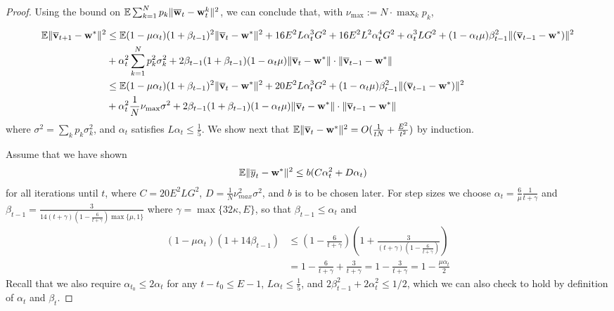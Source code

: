 \begin{proof}
Using the bound on $\mathbb{E}\sum_{k=1}^{N}p_{k}\|{\overline{\mathbf{w}}}_{t}-{\mathbf{w}}_{t}^{k}\|^{2}$,
we can conclude that, with $\nu_{\max}:=N\cdot\max_{k}p_{k}$,

\begin{align*}
\mathbb{E}\|{\overline{\mathbf{v}}}_{t+1}-{\mathbf{w}}^{\ast}\|^{2} & \leq\mathbb{E}(1-\mu\alpha_{t})(1+\beta_{t-1})^{2}\|{\overline{\mathbf{v}}}_{t}-{\mathbf{w}}^{\ast}\|^{2}+16E^{2}L\alpha_{t}^{3}G^{2}+16E^{2}L^{2}\alpha_{t}^{4}G^{2}+\alpha_{t}^{3}LG^{2}+(1-\alpha_{t}\mu)\beta_{t-1}^{2}\|({\overline{\mathbf{v}}}_{t-1}-{\mathbf{w}}^{\ast})\|^{2}\\
& +\alpha_{t}^{2}\sum_{k=1}^{N}p_{k}^{2}\sigma_{k}^{2}+2\beta_{t-1}(1+\beta_{t-1})(1-\alpha_{t}\mu)\|{\overline{\mathbf{v}}}_{t}-{\mathbf{w}}^{\ast}\|\cdot\|{\overline{\mathbf{v}}}_{t-1}-{\mathbf{w}}^{\ast}\|\\
& \leq\mathbb{E}(1-\mu\alpha_{t})(1+\beta_{t-1})^{2}\|{\overline{\mathbf{v}}}_{t}-{\mathbf{w}}^{\ast}\|^{2}+20E^{2}L\alpha_{t}^{3}G^{2}+(1-\alpha_{t}\mu)\beta_{t-1}^{2}\|({\overline{\mathbf{v}}}_{t-1}-{\mathbf{w}}^{\ast})\|^{2}\\
& +\alpha_{t}^{2}\frac{1}{N}\nu_{\max}\sigma^{2}+2\beta_{t-1}(1+\beta_{t-1})(1-\alpha_{t}\mu)\|{\overline{\mathbf{v}}}_{t}-{\mathbf{w}}^{\ast}\|\cdot\|{\overline{\mathbf{v}}}_{t-1}-{\mathbf{w}}^{\ast}\|
\end{align*}
where $\sigma^{2}=\sum_{k}p_{k}\sigma_{k}^{2}$, and $\alpha_{t}$
satisfies $L\alpha_{t}\leq\frac{1}{5}$. We show next that $\mathbb{E}\|{\overline{\mathbf{v}}}_{t}-{\mathbf{w}}^{\ast}\|^{2}=O(\frac{1}{tN}+\frac{E^{2}}{t^{2}})$
by induction.

Assume that we have shown 
\begin{align*}
\mathbb{E}\|\overline{y}_{t}-{\mathbf{w}}^{\ast}\|^{2} & \leq b(C\alpha_{t}^{2}+D\alpha_{t})
\end{align*}
for all iterations until $t$, where $C=20E^{2}LG^{2}$, $D=\frac{1}{N}\nu_{max}^{2}\sigma^{2}$,
and $b$ is to be chosen later. For step sizes we choose $\alpha_{t}=\frac{6}{\mu}\frac{1}{t+\gamma}$
and $\beta_{t-1}=\frac{3}{14(t+\gamma)(1-\frac{6}{t+\gamma})\max\{\mu,1\}}$
where $\gamma=\max\{32\kappa,E\}$, so that $\beta_{t-1}\leq\alpha_{t}$
and 
\begin{align*}
(1-\mu\alpha_{t})(1+14\beta_{t-1}) & \leq(1-\frac{6}{t+\gamma})(1+\frac{3}{(t+\gamma)(1-\frac{6}{t+\gamma})})\\
& =1-\frac{6}{t+\gamma}+\frac{3}{t+\gamma}=1-\frac{3}{t+\gamma}=1-\frac{\mu\alpha_{t}}{2}
\end{align*}
Recall that we also require $\alpha_{t_{0}}\leq2\alpha_{t}$ for any
$t-t_{0}\leq E-1$, $L\alpha_{t}\leq\frac{1}{5}$, and $2\beta_{t-1}^{2}+2\alpha_{t}^{2}\leq1/2$,
which we can also check to hold by definition of $\alpha_{t}$ and
$\beta_{t}$.


\end{proof}
